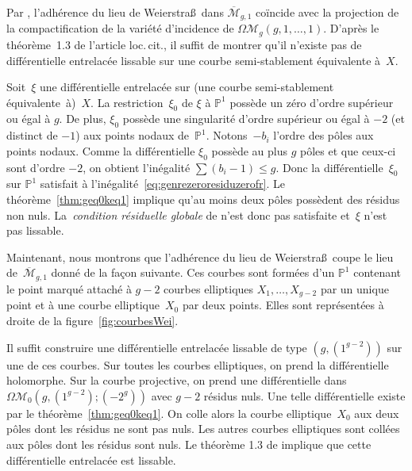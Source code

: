 \documentclass[JEP,XML,SOM,Unicode,francais,NoFloatCountersInSection,published]{cedram}
\let\mathcal\mathscr
\newcommand{\PP}{{\mathbb{P}}}
\newcommand{\barmoduli}[1][g]{{\overline{\mathcal M}}_{\!#1}}
\newcommand{\omoduli}[1][g]{{\Omega\mathcal M}_{\!#1}}
\newcommand{\Weierstrass}{Weierstra\ss{}}
\theoremstyle{definition}
\begin{document}
Par \cite[\S3.6]{BCGGM}, l'adhérence du lieu de \Weierstrass~dans $\barmoduli[g,1]$ coïncide avec la projection de la compactification de la variété d'incidence de $\omoduli[g](g,1,\dots,1)$. D'après le théorème~1.3 de l'article loc.\,cit., il suffit de montrer qu'il n'existe pas de différentielle entrelacée lissable sur une courbe semi-stablement équivalente à~$X$.

Soit~$\xi$ une différentielle entrelacée sur (une courbe semi-stablement équivalente~à)~$X$. La restriction~$\xi_{0}$ de $\xi$ à $\PP^{1}$ possède un zéro d'ordre supérieur ou égal à $g$. De plus, $\xi_{0}$ possède une singularité d'ordre supérieur ou égal à $-2$ (et distinct de $-1$) aux points nodaux de~$\PP^{1}$. Notons~$-b_{i}$ l'ordre des pôles aux points nodaux. Comme la différentielle $\xi_{0}$ possède au plus $g$ pôles et que ceux-ci sont d'ordre $-2$, on obtient l'inégalité $\sum (b_{i}-1) \leq g$. Donc la différentielle~$\xi_{0}$ sur $\PP^{1}$ satisfait à l'inégalité~\eqref{eq:genrezeroresiduzerofr}. Le théorème~\ref{thm:geq0keq1} implique qu'au moins deux pôles possèdent des résidus non nuls. La~\emph{condition résiduelle globale} de \cite[Def.\,1.2]{BCGGM} n'est donc pas satisfaite et~$\xi$ n'est pas lissable.

Maintenant, nous montrons que l'adhérence du lieu de \Weierstrass~coupe le lieu de~$\barmoduli[g,1]$ donné de la façon suivante. Ces courbes sont formées d'un $\PP^{1}$ contenant le point marqué attaché à $g-2$ courbes elliptiques $X_{1},\dots,X_{g-2}$ par un unique point et à une courbe elliptique~$X_{0}$ par deux points. Elles sont représentées à droite de la figure~\ref{fig:courbesWei}.

Il suffit construire une différentielle entrelacée lissable de type $(g,(1^{g-2}))$ sur une de ces courbes. Sur toutes les courbes elliptiques, on prend la différentielle holomorphe. Sur la courbe projective, on prend une différentielle dans $\omoduli[0](g,(1^{g-2});(-2^{g}))$ avec $g-2$ résidus nuls. Une telle différentielle existe par le théorème~\ref{thm:geq0keq1}. On colle alors la courbe elliptique~$X_{0}$ aux deux pôles dont les résidus ne sont pas nuls. Les autres courbes elliptiques sont collées aux pôles dont les résidus sont nuls. Le théorème 1.3 de \cite{BCGGM} implique que cette différentielle entrelacée est lissable.
\end{document}
